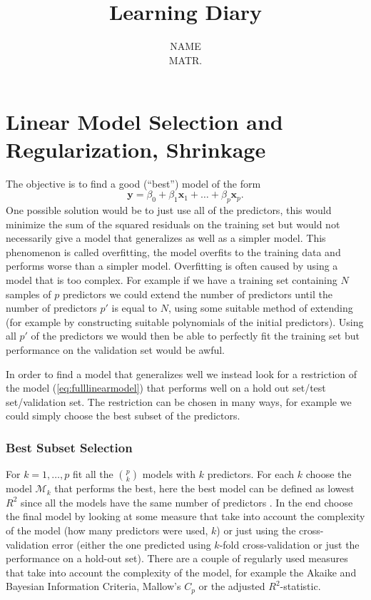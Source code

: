 \documentclass[a4paper, 12pt]{scrartcl}
\title{\vspace{0.7cm}{\Large \textbf{TILM3592\\Advanced Statistical Learning}}\\{\LARGE \bfseries Learning Diary}}
\author{{\large NAME}\\
{ MATR.}}
\date{}
\newcommand{\bfx}{\mathbf{x}}
\begin{document}
\maketitle


\section{Linear Model Selection and Regularization, Shrinkage}

The objective is to find a good (``best'') model of the form
\begin{equation}\label{eq:fulllinearmodel}
	\mathbf{y}=\beta_0+\beta_1\bfx_1+\ldots+\beta_p\bfx_p.
\end{equation}
One possible solution would be to just use all of the predictors, this would minimize the sum of the squared residuals on the training set but would not necessarily give a model that generalizes as well as a simpler model.
This phenomenon is called overfitting, the model overfits to the training data and performs worse than a simpler model.
Overfitting is often caused by using a model that is too complex.
For example if we have a training set containing $N$ samples of $p$ predictors we could extend the number of predictors until the number of predictors $p'$ is equal to $N$, using some suitable method of extending (for example by constructing suitable polynomials of the initial predictors).
Using all $p'$ of the predictors we would then be able to perfectly fit the training set but performance on the validation set would be awful.

In order to find a model that generalizes well we instead look for a restriction of the model (\ref{eq:fulllinearmodel}) that performs well on a hold out set/test set/validation set.
The restriction can be chosen in many ways, for example we could simply choose the best subset of the predictors.

\subsubsection*{Best Subset Selection}
\begin{algorithm}
For $k=1,\ldots,p$ fit all the ${p \choose k}$ models with $k$ predictors.
For each $k$ choose the model $\mathcal{M}_k$ that performs the best, here the best model can be defined as lowest $R^2$ since all the models have the same number of predictors .
In the end choose the final model by looking at some measure that take into account the complexity of the model (how many predictors were used, $k$) or just using the cross-validation error (either the one predicted using $k$-fold cross-validation or just the performance on a hold-out set).
There are a couple of regularly used measures that take into account the complexity of the model, for example the Akaike and Bayesian Information Criteria, Mallow's $C_p$ or the adjusted $R^2$-statistic.
\end{algorithm}
\end{document}
